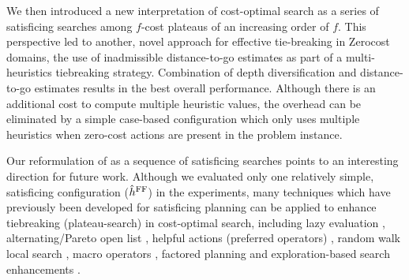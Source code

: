We then introduced a new interpretation of cost-optimal \astar search as a series of satisficing
       searches among $f$-cost plateaus of an increasing order of $f$. 
This perspective led to another, novel approach for effective tie-breaking in Zerocost domains, the use of
       inadmissible distance-to-go estimates as part of a multi-heuristics tiebreaking strategy.
       Combination of depth diversification and distance-to-go estimates results in the best overall performance. Although there is an additional cost to compute
       multiple heuristic values, the overhead can be eliminated by a simple
       case-based configuration which only uses multiple heuristics when zero-cost actions are present in the problem instance.

Our reformulation of \astar as a sequence of satisficing searches  points to  an interesting direction for future work.
Although we evaluated only one relatively simple, satisficing configuration ($\hat{h}^{\text{FF}}$) in
the experiments, many techniques which have previously been developed for satisficing planning can be applied to enhance tiebreaking (plateau-search) in cost-optimal search, including
lazy evaluation \cite{richter2010lama}, alternating/Pareto open
list \cite{RogerH10}, helpful actions (preferred operators) \cite{Hoffmann01},
random walk local search \cite{nakhost2009monte}, macro operators
\cite{Botea2005,ChrpaVM15}, factored planning
\cite{amir2003factored,brafman2006factored,Asai2015} and
exploration-based search enhancements
\cite{valenzano2014comparison,xie14type,Valenzano2016}.

